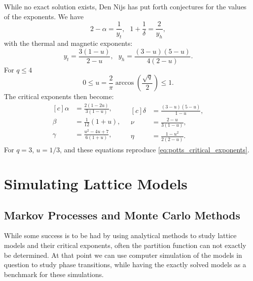 \documentclass[11pt, a4paper]{report} %
\begin{document}
While no exact solution exists, Den Nijs has put forth conjectures for the values of the exponents.\cite{nijs:1979}
We have
\begin{equation}
	2 - \alpha = \frac{1}{y_t} ,\ \ \ 1 + \frac{1}{\delta} = \frac{2}{y_h},
\end{equation}
with the thermal and magnetic exponents:
\begin{equation}
	y_t = \frac{3(1-u)}{2-u},\ \ \ y_h = \frac{(3-u)(5-u)}{4(2-u)}.
\end{equation}
For \(q \leq 4\)\cite{wu:1982}
\begin{equation}
	0 \leq u = \frac{2}{\pi} \arccos(\frac{\sqrt{q}}{2}) \leq 1.
\end{equation}
The critical exponents then become\cite{wu:1982, baxter:1989}:
\begin{equation}
	\begin{aligned}[c]
		\alpha &= \frac{2(1-2u)}{3(1-u)}, \\
		\beta &= \frac{1}{12}(1 + u), \\
		\gamma &= \frac{u^2 -4u +7}{6(1+u)}, \\
	\end{aligned}
	\ \ \
	\begin{aligned}[c]
		\delta &= \frac{(3-u)(5-u)}{1-u}, \\
		\nu &= \frac{2-u}{3(1-u)}, \\
		\eta &= \frac{1-u^2}{2(2-u)}.
	\end{aligned}
\end{equation}
For \(q=3\), \(u=1/3\), and these equations reproduce \cref{eq:potts_critical_exponents}.


\chapter{Simulating Lattice Models}

\section{Markov Processes and Monte Carlo Methods}
While some success is to be had by using analytical methods to study lattice models and their critical exponents, often the partition function can not exactly be determined.
At that point we can use computer simulation of the models in question to study phase transitions, while having the exactly solved models as a benchmark for these simulations.
\end{document}
